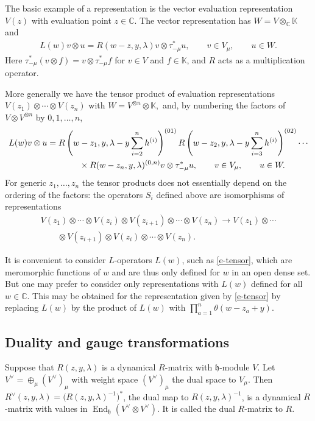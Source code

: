 \documentclass[10pt,a4paper]{amsart}
\numberwithin{equation}{section}
\begin{document}
The basic example of a representation is the vector evaluation representation $V(z)$ with evaluation point $z\in\mathbb C$. The vector representation has $W=V\otimes_{\mathbb C} \mathbb K$ and
\begin{gather*}
 L(w)v\otimes u=R(w-z,y,\lambda)v\otimes\tau_{-\mu}^* u,\qquad v\in V_\mu,\qquad u\in W.
\end{gather*}
Here $\tau^*_{-\mu} (v\otimes f)=v\otimes \tau_{-\mu}^*f$ for $v\in V$ and
$f\in\mathbb K$, and $R$ acts as a multiplication operator.

More generally we have the tensor product of evaluation
representations $V(z_1)\otimes\cdots\otimes V(z_n)$ with
$ W=V^{\otimes n}\otimes \mathbb K, $ and, by numbering the factors of
$V\otimes V^{\otimes n}$ by $0,1,\dots,n$,
\begin{gather}
 L(w)v\otimes u =R\left(w-z_1,y,\lambda-y\sum_{i=2}^nh^{(i)}\right)^{(01)} R\left(w-z_2,y,\lambda-y \sum_{i=3}^nh^{(i)}\right)^{(02)}\cdots\nonumber\\
\hphantom{L(w)v\otimes u =}{}\times R(w-z_n,y,\lambda)^{(0,n)} v\otimes\tau_{-\mu}^* u, \qquad v\in V_\mu,\qquad u\in W.\label{e-tensor}
\end{gather}
For generic $z_1,\dots, z_n$ the tensor products does not essentially depend on the ordering of the factors: the operators $S_i$ defined above are isomorphisms of representations
\begin{gather*}
 V(z_1)\otimes \cdots \otimes V(z_i)\otimes V(z_{i+1})\otimes\cdots\otimes V(z_n) \to V(z_1)\otimes \cdots \\
 \qquad{}\otimes V(z_{i+1})\otimes V(z_i)\otimes\cdots\otimes V(z_n).
\end{gather*}
\begin{Remark} It is convenient to consider $L$-operators $L(w)$, such as \eqref{e-tensor}, which are meromorphic functions of $w$ and are thus only defined for $w$ in an open dense set. But one may prefer to consider
only representations with $L(w)$ defined for all $w\in\mathbb C$. This may be obtained for the representation given by \eqref{e-tensor} by replacing $L(w)$ by the product of $L(w)$ with $\prod\limits_{a=1}^n\theta(w-z_a+y)$.
\end{Remark}
\subsection{Duality and gauge transformations}\label{ss-2.2}
Suppose that $R(z,y,\lambda)$ is a dynamical $R$-matrix with $\mathfrak h$-module $V$. Let $V^\vee=\oplus_\mu (V^\vee)_\mu$ with weight space $(V^\vee)_\mu$ the dual space to $V_\mu$. Then $R^\vee(z,y,\lambda)=\big(R(z,y,\lambda)^{-1}\big)^*$, the dual map to $R(z,y,\lambda)^{-1}$, is a dynamical $R$-matrix with values in $\operatorname{End}_{\mathfrak h}(V^\vee\otimes V^\vee)$. It is called the dual $R$-matrix to $R$.
\end{document}
